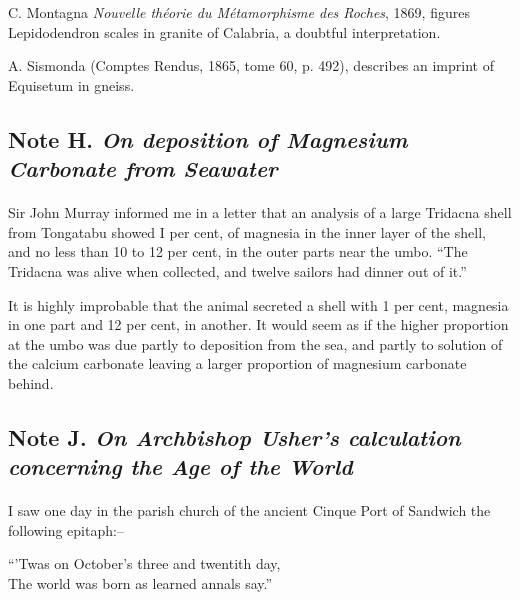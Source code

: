 \documentclass[a4paper, 12pt, oneside]{article}
\begin{document}
C. Montagna \emph{Nouvelle théorie du Métamorphisme des Roches}, 1869, figures Lepidodendron scales in granite of Calabria, a doubtful interpretation.

A. Sismonda (Comptes Rendus, 1865, tome 60, p. 492), describes an imprint of Equisetum in gneiss.

\subsection{Note H. \emph{On deposition of Magnesium Carbonate from Seawater}}
\paragraph{}
Sir John Murray informed me in a letter that an analysis of a large Tridacna shell from Tongatabu showed I per cent, of magnesia in the inner layer of the shell, and no less than 10 to 12 per cent, in the outer parts near the umbo. ``The Tridacna was alive when collected, and twelve sailors had dinner out of it.''

It is highly improbable that the animal secreted a shell with 1 per cent, magnesia in one part and 12 per cent, in another. It would seem as if the higher proportion at the umbo was due partly to deposition from the sea, and partly to solution of the calcium carbonate leaving a larger proportion of magnesium carbonate behind.

\subsection{Note J. \emph{On Archbishop Usher's calculation concerning the Age of the World}}
\paragraph{}
I saw one day in the parish church of the ancient Cinque Port of Sandwich the following epitaph:--
\begin{displayquote}
``'Twas on October's three and twentith day,\\The world was born as learned annals say.''
\end{displayquote}
\end{document}
